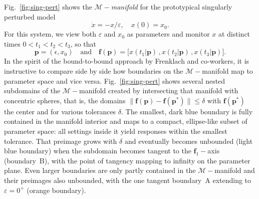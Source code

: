 
Fig.~\ref{fig:sing-pert} shows the $\mathcal{M}-$\emph{manifold} for
the prototypical singularly perturbed model
% 
\begin{equation}
  \dot{x} = -x/\varepsilon, \quad
  x(0) = x_0 .
  \label{1D-model-singpert}
\end{equation}
For this system, we view both $\varepsilon$ and $x_0$ as parameters
and monitor $x$ at distinct times $0 < t_1 < t_2 < t_3$, so that
% 
\begin{equation}
  \mathbf{p} = (\epsilon , x_0)
  \quad\mbox{and}\quad
  \mathbf{f}(\mathbf{p})
  =
  \big[
  x(t_1 \vert \mathbf{p}) \, ,
  x(t_2 \vert \mathbf{p}) \, ,
  x(t_3 \vert \mathbf{p})
  \big] . 
  \label{1D-pf}
\end{equation}
% 
In the spirit of the bound-to-bound approach by Frenklach and
co-workers, it is instructive to compare side by side how boundaries
on the $\mathcal{M}-$manifold map to parameter space and vice versa.
Fig.~\ref{fig:sing-pert} shows several nested subdomains of the
$\mathcal{M}-$manifold created by intersecting that manifold with
concentric spheres, that is, the domains
$\|\mathbf{f}(\mathbf{p}) - \mathbf{f}(\mathbf{p}^*)\| \le \delta$
with $\mathbf{f}(\mathbf{p}^*)$ the center and for various tolerances
$\delta$.  The smallest, dark blue boundary is fully contained in the
manifold interior and maps to a compact, ellipse-like subset of
parameter space: all settings inside it yield responses within the
smallest tolerance.  That preimage grows with $\delta$ and eventually
becomes unbounded (light blue boundary) when the subdomain becomes
tangent to the $\mathbf{f}_1-$axis (boundary~B), with the point of
tangency mapping to infinity on the parameter plane.  Even larger
boundaries are only partly contained in the $\mathcal{M}-$manifold and
their preimages also unbounded, with the one tangent boundary~A
extending to $\varepsilon=0^+$ (orange boundary).


